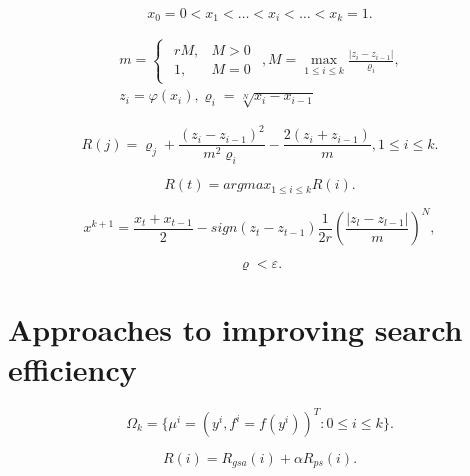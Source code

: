\documentclass[runningheads]{llncs}
\begin{document}
\begin{equation}
    \label{eq:09}
    x_0 = 0 < x_1 < \dots < x_i < \dots < x_{k} = 1.
\end{equation}


\begin{equation}
    \label{eq:10}
		\begin{matrix}
		m=\begin{cases}
				\begin{matrix}
					 r M, & M >0 \\
					 1, & M = 0 
				\end{matrix} 
			\end{cases} ,
		M = \max_{1 \leq i \leq k} \frac{| z_i - z_{i-1}|}{\varrho_i}, \\
		z_i = \varphi( x_i ), \varrho_i=\sqrt[N]{x_i-x_{i-1}}
		\end{matrix}
\end{equation}

\begin{equation}
    \label{eq:11}
    R(j) = \varrho_j + \frac{(z_i-z_{i-1})^2}{m^2 \varrho_i} - \frac{2 (z_i+z_{i-1})}{m}, 1 \leq i \leq k.
\end{equation}


\begin{equation}
    \label{eq:12}
    R(t) = argmax_{1 \leq i \leq k} {R(i)}.
\end{equation}


\begin{equation}
    \label{eq:13}
    x^{k+1} = \frac{x_t + x_{t-1}}{2} - sign(z_t - z_{t-1}) \frac{1}{2r} \left(\frac{|z_l - z_{l-1}|}{m} \right)^N,
\end{equation}


\begin{equation}
    \label{eq:14}
    \varrho < \varepsilon.
\end{equation}



\section{Approaches to improving search efficiency}
\label{sec:4}

\begin{equation}
    \label{eq:15}
    \Omega_k=\{\mu^i = (y^i,f^i=f(y^i))^T: 0 \leq i \leq k\}.
\end{equation}


\begin{equation}
    \label{eq:16}
    R(i) = R_{gsa} (i) +  \alpha R_{ps} (i).
\end{equation}
\end{document}
